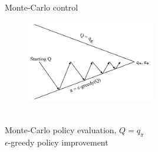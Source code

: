 \bgroup
\begin{frame}{Monte-Carlo control}
\begin{figure}
\centering
\includegraphics[width=0.5\textwidth]{img/mc_control.pdf}
\end{figure}
\\
 Monte-Carlo policy evaluation, $Q=q_{\pi}$\\
 $\epsilon$-greedy policy improvement
\end{frame}
\egroup